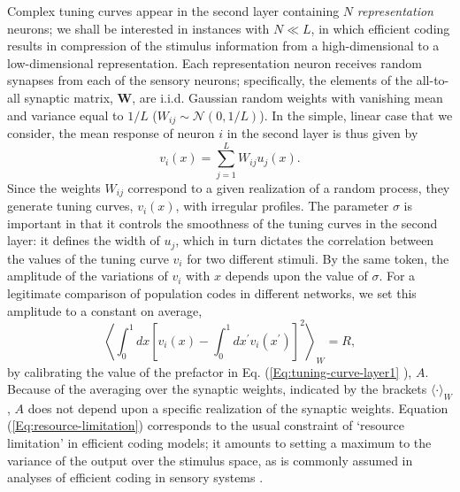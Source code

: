 \documentclass[a4paper]{article}%
\begin{document}
Complex tuning curves appear in the second layer containing $N$
\textit{representation} neurons; we shall be interested in instances with
$N\ll L$, in which efficient coding results in compression of the stimulus
information from a high-dimensional to a low-dimensional representation. Each
representation neuron receives random synapses from each of the sensory
neurons; specifically, the elements of the all-to-all synaptic matrix,
$\mathbf{W}$, are i.i.d. Gaussian random weights with vanishing mean and
variance equal to $1/L$ ($W_{ij}\sim\mathcal{N}\left(  0,1/L\right)  $). In
the simple, linear case that we consider, the mean response of neuron $i$ in
the second layer is thus given by
\begin{equation}
v_{i}\left(  x\right)  =\sum_{j=1}^{L}W_{ij}u_{j}\left(  x\right)  .
\label{Eq:tuning-curve-layer2}%
\end{equation}
Since the weights $W_{ij}$ correspond to a given realization of a random
process, they generate tuning curves, $v_{i}\left(  x\right)  $, with
irregular profiles. The parameter $\sigma$ is important in that it controls
the smoothness of the tuning curves in the second layer: it defines the width
of $u_{j}$, which in turn dictates the correlation between the values of the
tuning curve $v_{i}$ for two different stimuli. By the same token, the
amplitude of the variations of $v_{i}$ with $x$ depends upon the value of
$\sigma$. For a legitimate comparison of population codes in different
networks, we set this amplitude to a constant on average,
\begin{equation}
\left\langle \int_{0}^{1}dx\left[  v_{i}\left(  x\right)  -\int_{0}%
^{1}dx^{\prime}v_{i}\left(  x^{\prime}\right)  \right]  ^{2}\right\rangle
_{W}=R, \label{Eq:resource-limitation}%
\end{equation}
by calibrating the value of the prefactor in Eq. (\ref{Eq:tuning-curve-layer1}
), $A$. Because of the averaging over the synaptic weights, indicated by the
brackets $\langle\cdot\rangle_{W}$, $A$ does not depend upon a specific
realization of the synaptic weights. Equation (\ref{Eq:resource-limitation})
corresponds to the usual constraint of `resource limitation' in efficient
coding models; it amounts to setting a maximum to the variance of the output
over the stimulus space, as is commonly assumed in analyses of efficient
coding in sensory systems
\cite[]{Atick1990TowardsProcessing,VanHateren1998IndependentCortex,Doi2012EfficientRetina,Zhaoping2014UnderstandingData}.
\end{document}
